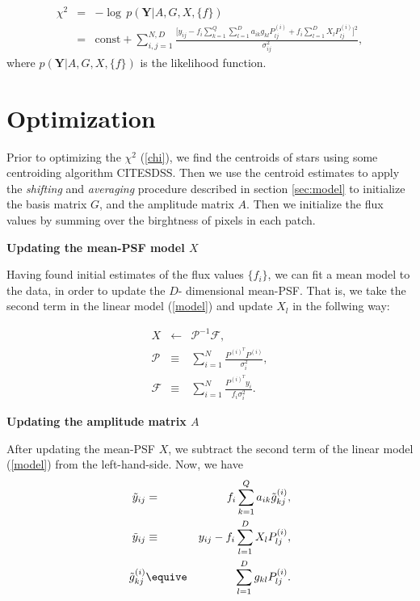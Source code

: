 \documentclass[12pt,preprint]{aastex}
\begin{document}
\begin{eqnarray}
\chi^{2} &=& - \log \, p(\mathbf{Y}|A,G,X,\{f\}) \\
         &=& \text{const} + \sum_{i,j=1}^{N,D} \frac{\Big[y_{ij} - 
             f_{i} \sum_{k=1}^{Q}\sum_{l=1}^{D} a_{ik}g_{kl}P^{(i)}_{lj} +
             f_{i}\sum_{l=1}^{D} X_{l}P^{(i)}_{lj}\Big]^{2}}{\sigma_{ij}^{2}},
\label{chi}
\end{eqnarray}
where $p(\mathbf{Y}|A,G,X,\{f\})$ is the likelihood function.


\section{Optimization}\label{sec:opt}

Prior to optimizing the $\chi^{2}$ (\ref{chi}), we find the centroids of stars
using some centroiding algorithm CITESDSS. Then we use the centroid estimates to 
apply the \emph{shifting} and \emph{averaging} procedure described in section \ref{sec:model}
to initialize the basis matrix $G$, and the amplitude matrix $A$. Then we initialize 
the flux values by summing over the birghtness of pixels in each patch.   
 
\item {\bf Updating the mean-PSF model $X$}\quad

Having found initial estimates of the flux values $\{f_{i}\}$, 
we can fit a mean model to the data, in order to update the $D$-
dimensional mean-PSF. That is, we take the second term in the 
linear model (\ref{model}) and update $X_{l}$ in the follwing way:

\begin{eqnarray}
X &\leftarrow& \mathcal{P}^{-1}\mathcal{F}, \\
\mathcal{P} &\equiv& \sum_{i=1}^{N} \frac{P^{(i)}^{T}P^{(i)}}{\sigma_{i}^{2}}, \\
\mathcal{F} &\equiv& \sum_{i=1}^{N} \frac{P^{(i)}^{T}y_{i}}{f_{i}\sigma_{i}^{2}}.
\end{eqnarray}

\item {\bf Updating the amplitude matrix $A$}\quad

After updating the mean-PSF $X$, we subtract the second term of the
linear model (\ref{model}) from the left-hand-side. Now, we have
\begin{eqnarray}
\tilde{y}_{ij} &=& f_{i}\sum_{k=1}^{Q}a_{ik}\tilde{g}^{(i)}_{kj}, \label{tildey} \\
\tilde{y}_{ij} &\equiv& y_{ij} - f_{i}\sum_{l=1}^{D} X_{l}P^{(i)}_{lj}, \\
\tilde{g}^{(i)}_{kj} &\equive& \sum_{l=1}^{D} g_{kl}P^{(i)}_{lj}.
\end{eqnarray}
\end{document}
